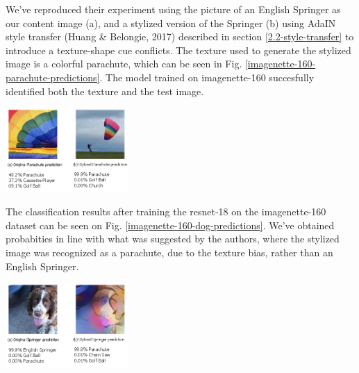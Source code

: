 \documentclass{article}
\begin{document}
\noindent
We've reproduced their experiment using the picture of an English Springer as our content image (a), 
and a stylized version of the Springer (b) using AdaIN style transfer
(Huang \& Belongie, 2017) described in section \ref{2.2-style-transfer}
to introduce a texture-shape cue conflicts.
The texture used to generate the stylized image is a colorful parachute, 
which can be seen in Fig. \ref{imagenette-160-parachute-predictions}. 
The model trained on imagenette-160 succesfully identified both the texture and the test image.
\medskip \par

\begin{center}
  \captionsetup{type=figure}
  \includegraphics[width=0.35\textwidth]{imgs/experiment-1/imagenette-160-parachute-predictions}
  \label{imagenette-160-parachute-predictions}
\end{center}

\noindent
The classification results after training the resnet-18 on the imagenette-160 dataset 
can be seen on Fig. \ref{imagenette-160-dog-predictions}.
We've obtained probabities in line with what was suggested by the authors, 
where the stylized image was recognized as a parachute, 
due to the texture bias, rather than an English Springer. \medskip \par

\begin{center}
  \captionsetup{type=figure}
  \includegraphics[width=0.35\textwidth]{imgs/experiment-1/imagenette-160-dog-predictions}
  \label{imagenette-160-dog-predictions}
\end{center}
\end{document}

